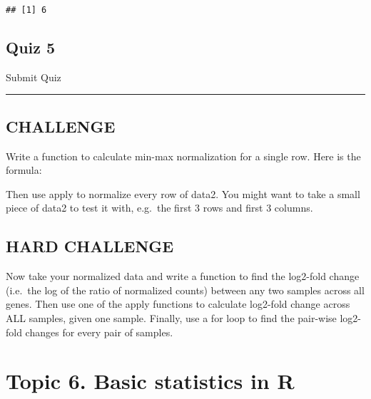 \documentclass[
]{article}
\begin{document}
\begin{verbatim}
## [1] 6
\end{verbatim}

\hypertarget{quiz-5}{%
\subsection{Quiz 5}\label{quiz-5}}

\hypertarget{quiz5}{}

Submit Quiz

\hypertarget{results5}{}

\begin{center}\rule{0.5\linewidth}{0.5pt}\end{center}

\hypertarget{challenge}{%
\subsection{CHALLENGE}\label{challenge}}

Write a function to calculate min-max normalization for a single row.
Here is the formula:

Then use apply to normalize every row of data2. You might want to take a
small piece of data2 to test it with, e.g.~the first 3 rows and first 3
columns.

\hypertarget{hard-challenge}{%
\subsection{HARD CHALLENGE}\label{hard-challenge}}

Now take your normalized data and write a function to find the log2-fold
change (i.e.~the log of the ratio of normalized counts) between any two
samples across all genes. Then use one of the apply functions to
calculate log2-fold change across ALL samples, given one sample.
Finally, use a for loop to find the pair-wise log2-fold changes for
every pair of samples.

\hypertarget{topic-6.-basic-statistics-in-r}{%
\section{Topic 6. Basic statistics in
R}\label{topic-6.-basic-statistics-in-r}}
\end{document}
